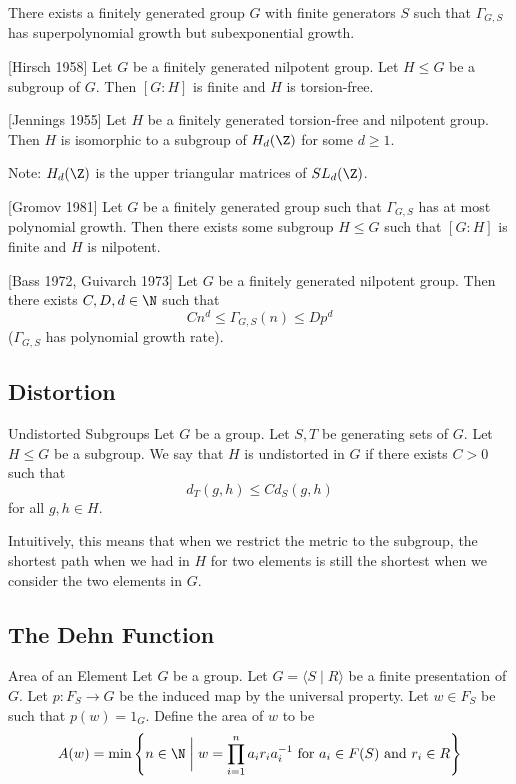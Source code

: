 \documentclass[a4paper]{article}
\begin{document}
\begin{thm}{}{} There exists a finitely generated group $G$ with finite generators $S$ such that $\Gamma_{G,S}$ has superpolynomial growth but subexponential growth. 
\end{thm}

\begin{thm}{[Hirsch 1958]}{} Let $G$ be a finitely generated nilpotent group. Let $H\leq G$ be a subgroup of $G$. Then $[G:H]$ is finite and $H$ is torsion-free. 
\end{thm}

\begin{thm}{[Jennings 1955]}{} Let $H$ be a finitely generated torsion-free and nilpotent group. Then $H$ is isomorphic to a subgroup of $H_d(\Z)$ for some $d\geq 1$. 
\end{thm}

Note: $H_d(\Z)$ is the upper triangular matrices of $SL_d(\Z)$. 

\begin{thm}{[Gromov 1981]}{} Let $G$ be a finitely generated group such that $\Gamma_{G,S}$ has at most polynomial growth. Then there exists some subgroup $H\leq G$ such that $[G:H]$ is finite and $H$ is nilpotent. 
\end{thm}

\begin{thm}{[Bass 1972, Guivarch 1973]}{} Let $G$ be a finitely generated nilpotent group. Then there exists $C,D,d\in\N$ such that $$Cn^d\leq\Gamma_{G,S}(n)\leq Dp^d$$ ($\Gamma_{G,S}$ has polynomial growth rate). 
\end{thm}

\subsection{Distortion}
\begin{defn}{Undistorted Subgroups}{} Let $G$ be a group. Let $S,T$ be generating sets of $G$. Let $H\leq G$ be a subgroup. We say that $H$ is undistorted in $G$ if there exists $C>0$ such that $$d_T(g,h)\leq C d_S(g,h)$$ for all $g,h\in H$. 
\end{defn}

Intuitively, this means that when we restrict the metric to the subgroup, the shortest path when we had in $H$ for two elements is still the shortest when we consider the two elements in $G$. 

\subsection{The Dehn Function}
\begin{defn}{Area of an Element}{} Let $G$ be a group. Let $G=\langle S\;|\;R\rangle$ be a finite presentation of $G$. Let $p:F_S\to G$ be the induced map by the universal property. Let $w\in F_S$ be such that $p(w)=1_G$. Define the area of $w$ to be $$A(w)=\min\left\{n\in\N\;\bigg{|}\;w=\prod_{i=1}^na_ir_ia_i^{-1}\text{ for }a_i\in F(S)\text{ and }r_i\in R\right\}$$
\end{defn}
\end{document}
